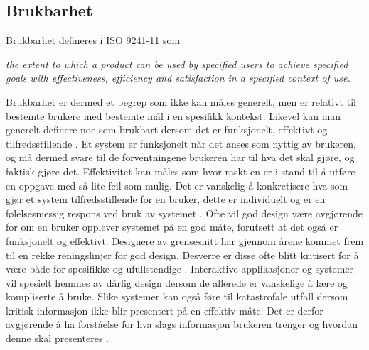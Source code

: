 \subsection{Brukbarhet}
\label{chp: brukbarhet}

Brukbarhet defineres i ISO 9241-11 \cite{Svanes08} som

\noindent
\begin{otherlanguage}{english}
\emph{the extent to which a product can be used by specified users to achieve specified goals with effectiveness, efficiency and satisfaction in a specified context of use.}
\end{otherlanguage}

\noindent
Brukbarhet er dermed et begrep som ikke kan måles generelt, men er relativt til bestemte brukere med bestemte mål i en spesifikk kontekst. Likevel kan man generelt definere noe som brukbart dersom det er funksjonelt, effektivt og tilfredsstillende \cite{Kuniavsky}. Et system er funksjonelt når det anses som nyttig av brukeren, og må dermed svare til de forventningene brukeren har til hva det skal gjøre, og faktisk gjøre det. Effektivitet kan måles som hvor raskt en er i stand til å utføre en oppgave med så lite feil som mulig. Det er vanskelig å konkretisere hva som gjør et system tilfredsstillende for en bruker, dette er individuelt og er en følelsesmessig respons ved bruk av systemet \cite{Kuniavsky}. Ofte vil god design være avgjørende for om en bruker opplever systemet på en god måte, forutsett at det også er funksjonelt og effektivt. Designere av grensesnitt har gjennom årene kommet frem til en rekke reningslinjer for god design. Desverre er disse ofte blitt kritisert for å være både for spesifikke og ufullstendige \cite{mmi}. 
Interaktive applikasjoner og systemer vil spesielt hemmes av dårlig design dersom de allerede er vanskelige å lære og kompliserte å bruke. Slike systemer kan også føre til katastrofale utfall dersom kritisk informasjon ikke blir presentert på en effektiv måte. Det er derfor avgjørende å ha forståelse for hva slags informasjon brukeren trenger og hvordan denne skal presenteres \cite{Ebright10}. 